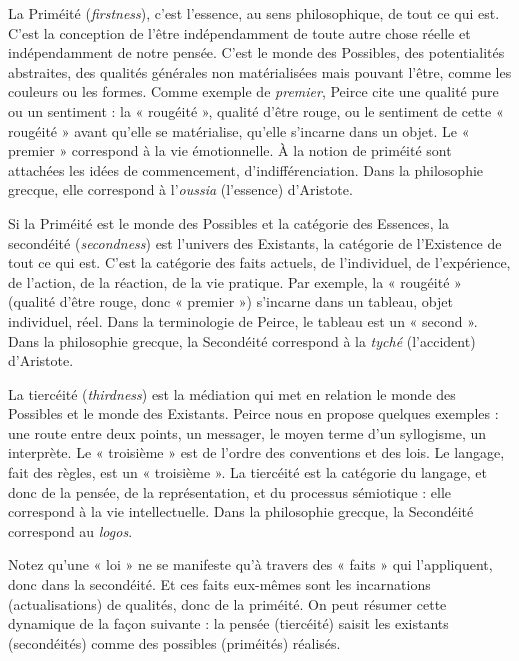 La Priméité (\textit{firstness}), c’est l’essence, au sens philosophique, de tout ce qui est. C’est la conception de l’être indépendamment de toute autre chose réelle et indépendamment de notre pensée. C’est le monde des Possibles, des potentialités abstraites, des qualités générales non matérialisées mais pouvant l’être, comme les couleurs ou les formes. Comme exemple de \textit{premier}, Peirce cite une qualité pure ou un sentiment : la « rougéité », qualité d’être rouge, ou le sentiment de cette « rougéité » avant qu’elle se matérialise, qu’elle s’incarne dans un objet. Le « premier » correspond à la vie émotionnelle. À la notion de priméité sont attachées les idées de commencement, d’indifférenciation. Dans la philosophie grecque, elle correspond à l’\textit{oussia} (l’essence) d’Aristote.

Si la Priméité est le monde des Possibles et la catégorie des Essences, la secondéité (\textit{secondness}) est l’univers des Existants, la catégorie de l’Existence de tout ce qui est. C’est la catégorie des faits actuels, de l’individuel, de l’expérience, de l’action, de la réaction, de la vie pratique. Par exemple, la « rougéité » (qualité d’être rouge, donc « premier ») s’incarne dans un tableau, objet individuel, réel. Dans la terminologie de Peirce, le tableau est un « second ». Dans la philosophie grecque, la Secondéité correspond à la \textit{tyché} (l’accident) d’Aristote.

La tiercéité (\textit{thirdness}) est la médiation qui met en relation le monde des Possibles et le monde des Existants. Peirce nous en propose quelques exemples : une route entre deux points, un messager, le moyen terme d’un syllogisme, un interprète. Le « troisième » est de l’ordre des conventions et des lois. Le langage, fait des règles, est un « troisième ». La tiercéité est la catégorie du langage, et donc de la pensée, de la représentation, et du processus sémiotique : elle correspond à la vie intellectuelle. Dans la philosophie grecque, la Secondéité correspond au \textit{logos}.

Notez qu’une « loi » ne se manifeste qu’à travers des « faits » qui l’appliquent, donc dans la secondéité. Et ces faits eux-mêmes sont les incarnations (actualisations) de qualités, donc de la priméité. On peut résumer cette dynamique de la façon suivante : la pensée (tiercéité) saisit les existants (secondéités) comme des possibles (priméités) réalisés.

